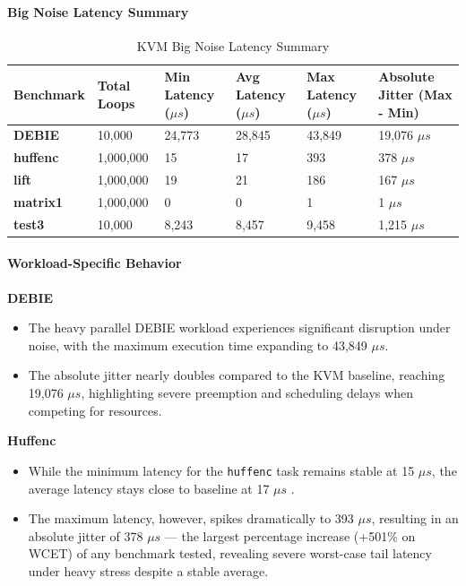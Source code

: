 \paragraph{Big Noise Latency Summary}\label{big-noise-latency-summary}

\begin{table}
\centering
\caption{KVM Big Noise Latency Summary}
\label{tab:kvm:big-noise}
\begin{tabularx}{\linewidth}{@{}YYYYYY@{}}
\toprule
Benchmark & Total Loops & Min Latency ($\mu s$) & Avg Latency ($\mu s$) & Max Latency ($\mu s$) & Absolute Jitter (Max - Min)\tabularnewline
\midrule
\textbf{DEBIE} & 10,000 & 24,773 & 28,845 & 43,849 & 19,076 $\mu s$\tabularnewline
\textbf{huffenc} & 1,000,000 & 15 & 17 & 393 & 378 $\mu s$\tabularnewline
\textbf{lift} & 1,000,000 & 19 & 21 & 186 & 167 $\mu s$\tabularnewline
\textbf{matrix1} & 1,000,000 & 0 & 0 & 1 & 1 $\mu s$\tabularnewline
\textbf{test3} & 10,000 & 8,243 & 8,457 & 9,458 & 1,215 $\mu s$\tabularnewline
\bottomrule
\end{tabularx}
\end{table}

\paragraph{Workload-Specific
Behavior}\label{workload-specific-behavior-2}

\textbf{DEBIE}

\begin{itemize}
\item
  The heavy parallel DEBIE workload experiences significant disruption
  under noise, with the maximum execution time expanding to 43,849 $\mu s$.
\item
  The absolute jitter nearly doubles compared to the KVM baseline,
  reaching 19,076 $\mu s$, highlighting severe preemption and scheduling
  delays when competing for resources.
\end{itemize}

\textbf{Huffenc}

\begin{itemize}
\item
  While the minimum latency for the \texttt{huffenc} task remains stable
  at 15 $\mu s$, the average latency stays close to baseline at 17 $\mu s$ .
\item
  The maximum latency, however, spikes dramatically to 393 $\mu s$, resulting
  in an absolute jitter of 378 $\mu s$ --- the largest percentage increase
  (+501\% on WCET) of any benchmark tested, revealing severe worst-case
  tail latency under heavy stress despite a stable average.
\end{itemize}

